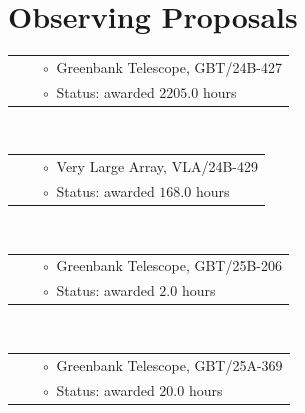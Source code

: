 \documentclass[11pt,letterpaper,sans,unicode]{moderncv}
\begin{document}
\section{Observing Proposals}
{\small
{}
\begin{tabular}{rcl}
&\hspace{0.4cm} &{\color{color1} $\circ\;\;$}Greenbank Telescope, GBT/24B-427  \\
&\hspace{0.4cm} &{\color{color1} $\circ\;\;$}Status: awarded $2205.0$ hours
\end{tabular} \\

\begin{tabular}{rcl}
&\hspace{0.4cm} &{\color{color1} $\circ\;\;$}Very Large Array, VLA/24B-429  \\
&\hspace{0.4cm} &{\color{color1} $\circ\;\;$}Status: awarded $168.0$ hours
\end{tabular} \\

\begin{tabular}{rcl}
&\hspace{0.4cm} &{\color{color1} $\circ\;\;$}Greenbank Telescope, GBT/25B-206 \\
&\hspace{0.4cm} &{\color{color1} $\circ\;\;$}Status: awarded $2.0$ hours
\end{tabular} \\

\begin{tabular}{rcl}
&\hspace{0.4cm} &{\color{color1} $\circ\;\;$}Greenbank Telescope, 
GBT/25A-369 \\
&\hspace{0.4cm} &{\color{color1} $\circ\;\;$}Status: awarded $20.0$ hours
\end{tabular} \\


}
\end{document}
